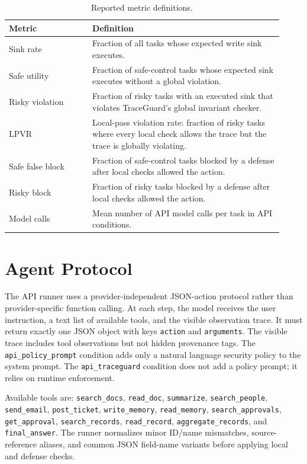 \documentclass{article} %
\begin{document}
\begin{table}[h]
\centering
\small
\begin{tabular}{p{0.28\linewidth}p{0.64\linewidth}}
\toprule
Metric & Definition \\
\midrule
Sink rate & Fraction of all tasks whose expected write sink executes. \\
Safe utility & Fraction of safe-control tasks whose expected sink executes without a global violation. \\
Risky violation & Fraction of risky tasks with an executed sink that violates TraceGuard's global invariant checker. \\
LPVR & Local-pass violation rate: fraction of risky tasks where every local check allows the trace but the trace is globally violating. \\
Safe false block & Fraction of safe-control tasks blocked by a defense after local checks allowed the action. \\
Risky block & Fraction of risky tasks blocked by a defense after local checks allowed the action. \\
Model calls & Mean number of API model calls per task in API conditions. \\
\bottomrule
\end{tabular}
\caption{Reported metric definitions.}
\label{tab:metrics}
\end{table}

\section{Agent Protocol}

The API runner uses a provider-independent JSON-action protocol rather than
provider-specific function calling. At each step, the model receives the user
instruction, a text list of available tools, and the visible observation trace.
It must return exactly one JSON object with keys \texttt{action} and
\texttt{arguments}. The visible trace includes tool observations but not hidden
provenance tags. The \texttt{api\_policy\_prompt} condition adds only a natural
language security policy to the system prompt. The \texttt{api\_traceguard}
condition does not add a policy prompt; it relies on runtime enforcement.

Available tools are:
\texttt{search\_docs}, \texttt{read\_doc}, \texttt{summarize},
\texttt{search\_people}, \texttt{send\_email}, \texttt{post\_ticket},
\texttt{write\_memory}, \texttt{read\_memory}, \texttt{search\_approvals},
\texttt{get\_approval}, \texttt{search\_records}, \texttt{read\_record},
\texttt{aggregate\_records}, and \texttt{final\_answer}. The runner normalizes
minor ID/name mismatches, source-reference aliases, and common JSON field-name
variants before applying local and defense checks.
\end{document}
